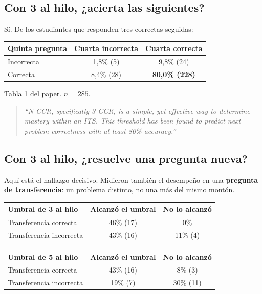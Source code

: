 \documentclass[11pt,a4paper]{article}
\newcommand{\cita}[1]{\begin{quote}\itshape\small #1\end{quote}}
\begin{document}
\subsection{Con 3 al hilo, ¿acierta las siguientes?}

Sí. De los estudiantes que responden tres correctas seguidas:

\begin{center}
\begin{tabular}{lcc}
\toprule
\textbf{Quinta pregunta} & \textbf{Cuarta incorrecta} & \textbf{Cuarta correcta} \\
\midrule
Incorrecta & 1{,}8\% (5) & 9{,}8\% (24) \\
Correcta   & 8{,}4\% (28) & \textbf{80{,}0\% (228)} \\
\bottomrule
\end{tabular}
\end{center}

\vspace{4pt}
{\small Tabla 1 del paper. $n = 285$.}

\cita{``N-CCR, specifically 3-CCR, is a simple, yet effective way to determine mastery within an ITS. This threshold has been found to predict next problem correctness with at least 80\% accuracy.''}

\subsection{Con 3 al hilo, ¿resuelve una pregunta nueva?}

Aquí está el hallazgo decisivo. Midieron también el desempeño en una \textbf{pregunta de transferencia}: un problema distinto, no una más del mismo montón.

\begin{center}
\begin{tabular}{lcc}
\toprule
\textbf{Umbral de 3 al hilo} & \textbf{Alcanzó el umbral} & \textbf{No lo alcanzó} \\
\midrule
Transferencia correcta   & 46\% (17) & 0\% \\
Transferencia incorrecta & 43\% (16) & 11\% (4) \\
\bottomrule
\end{tabular}
\end{center}

\vspace{6pt}

\begin{center}
\begin{tabular}{lcc}
\toprule
\textbf{Umbral de 5 al hilo} & \textbf{Alcanzó el umbral} & \textbf{No lo alcanzó} \\
\midrule
Transferencia correcta   & 43\% (16) & 8\% (3) \\
Transferencia incorrecta & 19\% (7)  & 30\% (11) \\
\bottomrule
\end{tabular}
\end{center}
\end{document}
